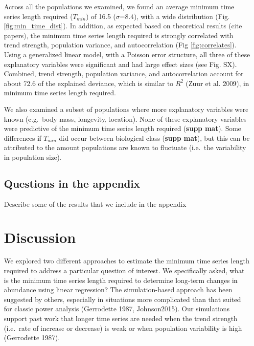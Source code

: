 \documentclass[12pt,]{article}
\begin{document}
Across all the populations we examined, we found an average minimum time
series length required (\(T_{min}\)) of 16.5 (\(\sigma\)=8.4), with a
wide distribution (Fig. \ref{fig:min_time_dist}). In addition, as
expected based on theoretical results (cite papers), the minimum time
series length required is strongly correlated with trend strength,
population variance, and autocorrelation (Fig \ref{fig:correlates}).
Using a generalized linear model, with a Poisson error structure, all
three of these explanatory variables were significant and had large
effect sizes (see Fig. SX). Combined, trend strength, population
variance, and autocorrelation account for about 72.6 of the explained
deviance, which is similar to \(R^2\) (Zuur et al. 2009), in minimum
time series length required.

We also examined a subset of populations where more explanatory
variables were known (e.g.~body mass, longevity, location). None of
these explanatory variables were predictive of the minimum time series
length required (\textbf{supp mat}). Some differences if \(T_{min}\) did
occur between biological class (\textbf{supp mat}), but this can be
attributed to the amount populations are known to fluctuate (i.e.~the
variability in population size).

\subsection{Questions in the appendix}\label{questions-in-the-appendix}

Describe some of the results that we include in the appendix

\section{Discussion}\label{discussion}

We explored two different approaches to estimate the minimum time series
length required to address a particular question of interest. We
specifically asked, what is the minimum time series length required to
determine long-term changes in abundance using linear regression? The
simulation-based approach has been suggested by others, especially in
situations more complicated than that suited for classic power analysis
(Gerrodette 1987, Johnson2015). Our simulations support past work that
longer time series are needed when the trend strength (i.e.~rate of
increase or decrease) is weak or when population variability is high
(Gerrodette 1987).
\end{document}
